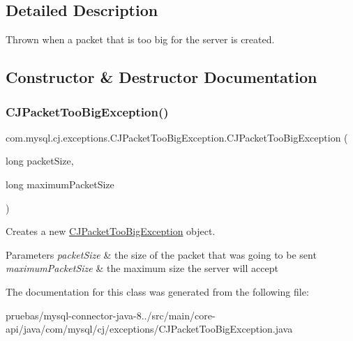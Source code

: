 \subsection{Detailed Description}
Thrown when a packet that is too big for the server is created. 

\subsection{Constructor \& Destructor Documentation}
\mbox{\label{classcom_1_1mysql_1_1cj_1_1exceptions_1_1_c_j_packet_too_big_exception_a2b7bde7117634bc639116d3977645c78}} 
\subsubsection{\texorpdfstring{C\+J\+Packet\+Too\+Big\+Exception()}{CJPacketTooBigException()}}
{\footnotesize\ttfamily com.\+mysql.\+cj.\+exceptions.\+C\+J\+Packet\+Too\+Big\+Exception.\+C\+J\+Packet\+Too\+Big\+Exception (\begin{DoxyParamCaption}\item[{long}]{packet\+Size,  }\item[{long}]{maximum\+Packet\+Size }\end{DoxyParamCaption})}

Creates a new \mbox{\hyperlink{classcom_1_1mysql_1_1cj_1_1exceptions_1_1_c_j_packet_too_big_exception}{C\+J\+Packet\+Too\+Big\+Exception}} object.


\begin{DoxyParams}{Parameters}
{\em packet\+Size} & the size of the packet that was going to be sent \\
\hline
{\em maximum\+Packet\+Size} & the maximum size the server will accept \\
\hline
\end{DoxyParams}


The documentation for this class was generated from the following file\+:\begin{DoxyCompactItemize}
\item 
pruebas/mysql-\/connector-\/java-\/8../src/main/core-\/api/java/com/mysql/cj/exceptions/C\+J\+Packet\+Too\+Big\+Exception.\+java\end{DoxyCompactItemize}
